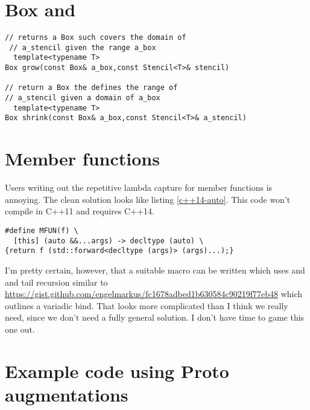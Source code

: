\documentclass[12pt,a4paper]{article}
\begin{document}
\section{Box  and  }
\begin{lstlisting}[caption=\code{Box} grow and shrink,label=grow]
 // returns a Box such covers the domain of
 // a_stencil given the range a_box
  template<typename T>
Box grow(const Box& a_box,const Stencil<T>& stencil)

// return a Box the defines the range of
// a_stencil given a domain of a_box 
  template<typename T>
Box shrink(const Box& a_box,const Stencil<T>& a_stencil)
\end{lstlisting}

\section{Member functions}
Users writing out the repetitive lambda capture for member functions
is annoying. The clean solution looks like listing \ref{c++14-auto}. This code won't compile in C++11 and requires C++14.
\begin{lstlisting}[label=c++14-auto,caption=C++14 macro for capturing
    arbitrary member functions]
  #define MFUN(f) \
  [this] (auto &&...args) -> decltype (auto) \
{return f (std::forward<decltype (args)> (args)...);}
\end{lstlisting}

I'm pretty certain, however, that a suitable macro can be written which uses  and  and tail recursion similar to \url{https://gist.github.com/engelmarkus/fc1678adbed1b630584c90219f77eb48}
which outlines a variadic bind.  That looks more complicated than I think we really need, since we don't need a fully general solution.  I don't have time to game this one out.

\section{Example code using Proto augmentations}

\begin{minipage}{\linewidth}

\end{minipage}
\end{document}
